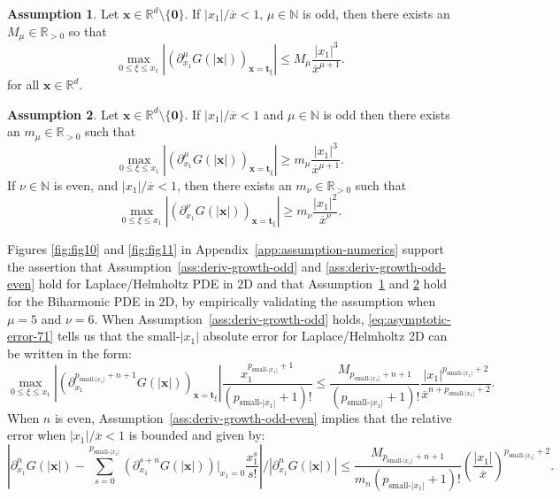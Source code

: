 \documentclass[12pt]{article}
\def\N{{\mathbb N}}
\def\R{{\mathbb R}}
\let\b=\boldsymbol
\theoremstyle{definition}
\theoremstyle{plain}
\theoremstyle{definition}
\newtheorem{assumption}{Assumption}
\begin{document}
\begin{assumption}
\label{ass:deriv-growth-cubed-odd}
Let $\b{x} \in \R^d \setminus \{\b{0}\}$. If $|x_1|/\overline{x} < 1$, $\mu \in \N$ is odd, then there exists an $M_\mu \in \R_{>0}$ so that
\[
\max_{0\leq \xi\leq x_1} \left|\left(\partial^{\mu}_{x_1}G(|\b{x}|)\right)_{\b{x}=\b{t}_\xi}\right| \leq M_\mu\frac{|x_1|^{3}}{\overline{x}^{\mu+1}}.
\]
for all $\b{x} \in \R^d$.
\end{assumption}

\begin{assumption}
\label{ass:deriv-growth-cubed-odd-even}
Let $\b{x} \in \R^d \setminus \{\b{0}\}$. If $|x_1|/\overline{x} < 1$ and $\mu \in \N$ is odd then there exists an $m_\mu \in \R_{>0}$ such that
\[
\max_{0\leq \xi\leq x_1} \left|\left(\partial^{\mu}_{x_1}G(|\b{x}|)\right)_{\b{x}=\b{t}_\xi}\right| \geq m_\mu\frac{|x_1|^3}{\overline{x}^{\mu+1}}.
\]
If $\nu \in \N$ is even, and $|x_1|/\overline{x} < 1$, then there exists an $m_\nu \in \R_{>0}$ such that
\[
\max_{0\leq \xi\leq x_1} \left|\left(\partial^{\nu}_{x_1}G(|\b{x}|)\right)_{\b{x}=\b{t}_\xi}\right| \geq m_\nu\frac{|x_1|^2}{\overline{x}^{\nu}}.
\]
\end{assumption}
Figures \ref{fig:fig10} and \ref{fig:fig11} in Appendix~\ref{app:assumption-numerics} support the assertion that Assumption~\ref{ass:deriv-growth-odd} and \ref{ass:deriv-growth-odd-even} hold for Laplace/Helmholtz PDE in 2D and that Assumption~\ref{ass:deriv-growth-cubed-odd} and \ref{ass:deriv-growth-cubed-odd-even} hold for the Biharmonic PDE in 2D, by empirically validating the assumption when $\mu=5$ and $\nu=6$.
When Assumption~\ref{ass:deriv-growth-odd} holds, \eqref{eq:asymptotic-error-71} tells us that the small-$|x_1|$ absolute error for Laplace/Helmholtz 2D can be written in the form:
\begin{equation}
\label{eq:abs-error}
\max_{0\leq \xi\leq x_1} \left|\left(\partial^{p_{\text{small-$|x_1|$}}+n+1}_{x_1}G(|\b{x}|)\right)_{\b{x}=\b{t}_\xi}\right| \frac{ x_1^{p_{\text{small-$|x_1|$}}+1}}{(p_{\text{small-$|x_1|$}}+1)!} \leq   \frac{M_{p_{\text{small-$|x_1|$}}+n+1}}{(p_{\text{small-$|x_1|$}}+1)!}\frac{|x_1|^{p_{\text{small-$|x_1|$}}+2}}{\overline{x}^{n+p_{\text{small-$|x_1|$}}+2}}.
\end{equation}
When $n$ is even, Assumption~\ref{ass:deriv-growth-odd-even} implies that the relative error when $|x_1|/\overline{x} < 1$ is bounded and given by:
\[
\left|\partial^n_{x_1} G(|\b{x}|) - \sum_{s=0}^{p_{\text{small-$|x_1|$}}} \left( \partial^{s+n}_{x_1} G(|\b{x}|) \right)|_{x_1=0} \frac{x_1^s}{s!} \right| / \left| \partial^n_{x_1} G(|\b{x}|)  \right| \leq \frac{M_{p_{\text{small-$|x_1|$}}+n+1}}{m_n(p_{\text{small-$|x_1|$}}+1)!} \left(\frac{|x_1|}{\overline{x}}\right)^{p_{\text{small-$|x_1|$}}+2}.
\]
\end{document}
